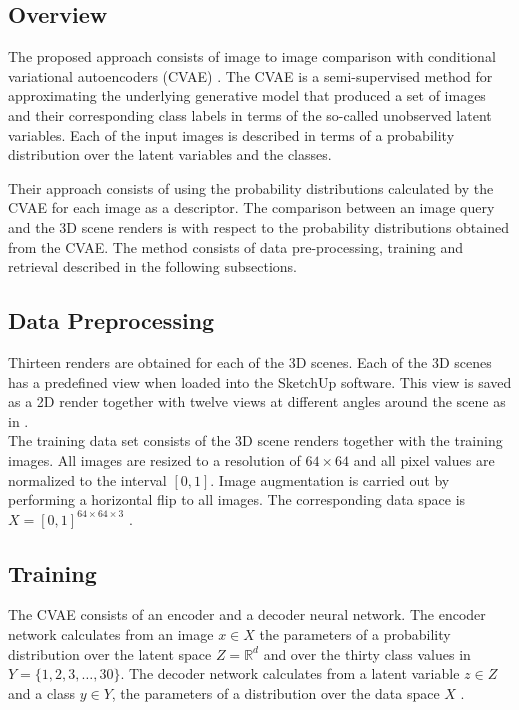 \documentclass[../main.tex]{subfiles}
\begin{document}
\subsection{Overview}
The proposed approach consists of image to image comparison with conditional variational autoencoders (CVAE) \cite{Kingma2014a}. The CVAE is a semi-supervised method for approximating the underlying generative model that produced a set of images and their corresponding class labels in terms of the so-called unobserved latent variables. Each of the input images is described in terms of a probability distribution over the latent variables and the classes. 

Their approach consists of using the probability distributions calculated by the CVAE for each image as a descriptor. The comparison between an image query and the 3D scene renders is with respect to the probability distributions obtained from the CVAE. The method consists of data pre-processing, training and retrieval described in the following subsections.

\subsection{Data Preprocessing}
Thirteen renders are obtained for each of the 3D scenes. Each of the 3D scenes has a predefined view when loaded into the SketchUp software. This view is saved as a 2D render together with twelve views at different angles around the scene as in \cite{Su2015}.\\

The training data set consists of the 3D scene renders together with the training images. All images are resized to a resolution of $64\times64$ and all pixel values are normalized to the interval $[0,1]$. Image augmentation is carried out by performing a horizontal flip to all images. The corresponding data space is $X = [0,1]^{64\times 64 \times 3}$ . 

\subsection{Training}
The CVAE consists of an encoder and a decoder neural network. The encoder network calculates from an image $x\in X$ the parameters of a probability distribution over the latent space $Z = \mathbb{R}^d$ and over the thirty class values in $Y = \{1,2,3,\ldots, 30\}$. The decoder network calculates from a latent variable $z\in Z$ and a class $y\in Y$, the parameters of a distribution over the data space $X$ .\\
\end{document}

